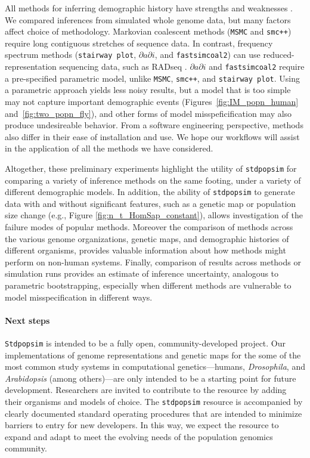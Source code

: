 \documentclass[12pt,halfline,a4paper]{ouparticle}
\newcommand{\Stdpopsim}{\texttt{Stdpopsim}\xspace}
\newcommand{\stdpopsim}{\texttt{stdpopsim}\xspace}
\newcommand{\dadi}{$\partial a \partial i$\xspace}
\newcommand{\MSMC}{\texttt{MSMC}\xspace}
\newcommand{\smcpp}{\texttt{smc++}\xspace}
\newcommand{\stairwayplot}{\texttt{stairway plot}\xspace}
\newcommand{\fastsimcoal}{\texttt{fastsimcoal2}\xspace}
\begin{document}
All methods for inferring demographic history have strengths and weaknesses \citep[as recently reviewed by][]{beichman2018review}.
We compared inferences from simulated whole genome data, but many factors affect choice of methodology.
Markovian coalescent methods (\MSMC and \smcpp) require long contiguous stretches of sequence data.
In contrast, frequency spectrum methods (\stairwayplot, \dadi, and \fastsimcoal) can use reduced-representation sequencing data, such as RADseq \citep{andrews2016radseq}.
\dadi and \fastsimcoal require a pre-specified parametric model, unlike \MSMC, \smcpp, and \stairwayplot.
Using a parametric approach yields less noisy results, but a model that is too simple may not capture important demographic events (Figures~\ref{fig:IM_popn_human} and~\ref{fig:two_popn_fly}),
and other forms of model misspeficification may also produce undesireable behavior.
From a software engineering perspective, methods also differ in their ease of installation and use.
We hope our workflows will assist in the application of all the methods we have considered.

Altogether, these preliminary experiments highlight
the utility of \stdpopsim for comparing a variety of inference methods on
the same footing, under a variety of different demographic models.
In addition, the ability of \stdpopsim to generate data with and without significant features, such
as a genetic map or population size change (e.g., Figure \ref{fig:n_t_HomSap_constant}), allows
investigation of the failure modes of popular methods.
Moreover the comparison of methods across the various genome organizations, genetic maps,
and demographic histories of different organisms, provides valuable information
about how methods might perform on non-human systems.
Finally, comparison of results across methods or simulation runs
provides an estimate of inference uncertainty, analogous to parametric bootstrapping,
especially when different methods are vulnerable to model misspecification in different ways.

\paragraph{Next steps}
\Stdpopsim is intended to be a fully open, community-developed project.
Our implementations of genome representations and genetic maps for the some of
the most common study systems in computational genetics---humans, \textit{Drosophila},
and \textit{Arabidopsis} (among others)---are only intended to be a starting point for
future development.
Researchers are invited to contribute to the resource by adding their
organisms and models of choice. The \stdpopsim resource is
accompanied by clearly documented standard operating procedures that are
intended to minimize barriers to entry for new developers.  In this way, we
expect the resource to expand and adapt to meet the evolving needs of the
population genomics community.
\end{document}
